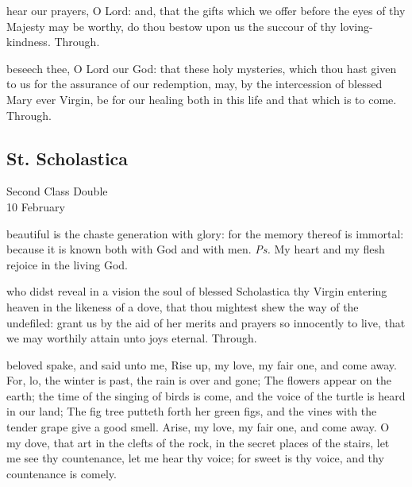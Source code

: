 \secret
{} hear our prayers, O Lord: and, that the gifts which we offer before the eyes of thy Majesty may be worthy, do thou bestow upon us the succour of thy loving-kindness. Through.


\postcommunion
{} beseech thee, O Lord our God: that these holy mysteries, which thou hast given to us for the assurance of our redemption, may, by the intercession of blessed Mary ever Virgin, be for our healing both in this life and that which is to come. Through.


\clearpage
\subsection{St. Scholastica}
\begin{inhead}
    {Second Class Double\\
10 February}
\end{inhead}


\introit
{} beautiful is the chaste generation with glory: for the memory thereof is immortal: because it is known both with God and with men. \textit{Ps.} My heart and my flesh rejoice in the living God.

\collect
{} who didst reveal in a vision the soul of blessed Scholastica thy Virgin entering heaven in the likeness of a dove, that thou mightest shew the way of the undefiled: grant us by the aid of her merits and prayers so innocently to live, that we may worthily attain unto joys eternal. Through.

 beloved spake, and said unto me, Rise up, my love, my fair one, and come away. For, lo, the winter is past, the rain is over and gone; The flowers appear on the earth; the time of the singing of birds is come, and the voice of the turtle is heard in our land; The fig tree putteth forth her green figs, and the vines with the tender grape give a good smell. Arise, my love, my fair one, and come away. O my dove, that art in the clefts of the rock, in the secret places of the stairs, let me see thy countenance, let me hear thy voice; for sweet is thy voice, and thy countenance is comely.


